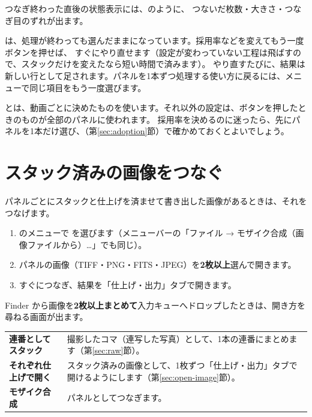 つなぎ終わった直後の状態表示には、のように、
つないだ枚数・大きさ・つなぎ目のずれが出ます。

\begin{tip}[設定を変えてやり直す]
   は、処理が終わっても選んだままになっています。採用率などを変えてもう一度ボタンを押せば、
  すぐにやり直せます（設定が変わっていない工程は飛ばすので、スタックだけを変えたなら短い時間で済みます）。
  やり直すたびに、結果は新しい行として足されます。パネルを1本ずつ処理する使い方に戻るには、メニューで同じ項目をもう一度選びます。
\end{tip}

\begin{caution}[フレームの範囲と処理範囲はパネルごと]
  とは、動画ごとに決めたものを使います。それ以外の設定は、ボタンを押したときのものが全部のパネルに使われます。
  採用率を決めるのに迷ったら、先にパネルを1本だけ選び、（第\ref{sec:adoption}節）で確かめておくとよいでしょう。
\end{caution}

\section{スタック済みの画像をつなぐ}\label{sec:mosaic-files}

パネルごとにスタックと仕上げを済ませて書き出した画像があるときは、それをつなげます。

\begin{enumerate}[itemsep=2pt]
  \item {} のメニューで  を選びます（メニューバーの「ファイル → モザイク合成（画像ファイルから）…」でも同じ）。
  \item パネルの画像（TIFF・PNG・FITS・JPEG）を\textbf{2枚以上}選んで開きます。
  \item すぐにつなぎ、結果を「仕上げ・出力」タブで開きます。
\end{enumerate}

Finder から画像を\textbf{2枚以上まとめて}入力キューへドロップしたときは、開き方を尋ねる画面が出ます。

\begin{center}\small
\begin{tabularx}{0.95\linewidth}{@{}>{\sffamily\bfseries}l X@{}}
\toprule
連番としてスタック & 撮影したコマ（連写した写真）として、1本の連番にまとめます（第\ref{sec:raw}節）。\\
それぞれ仕上げで開く & スタック済みの画像として、1枚ずつ「仕上げ・出力」タブで開けるようにします（第\ref{sec:open-image}節）。\\
モザイク合成 & パネルとしてつなぎます。\\
\bottomrule
\end{tabularx}
\end{center}


